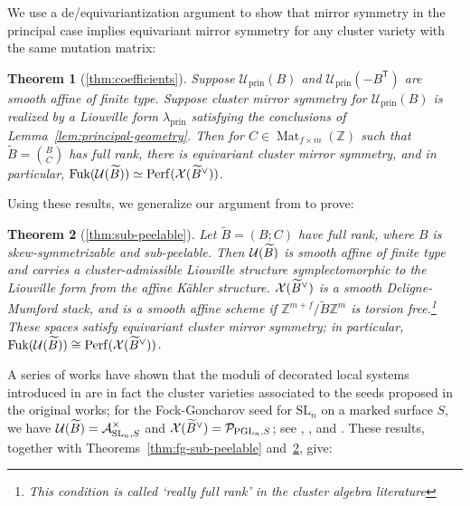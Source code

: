 \documentclass[12pt, letter]{amsart}
\newtheorem{theorem}{Theorem}[section]
\theoremstyle{definition}
\newcommand{\Z}{\mathbb Z}
\newcommand{\Ac}{\mathcal A}
\newcommand{\PP}{\mathcal P}
\newcommand{\pr}{\mathrm{prin}}
\numberwithin{equation}{section}
\begin{document}
We use a de/equivariantization argument to show that mirror symmetry in the principal case implies equivariant mirror symmetry for any cluster variety with the same mutation matrix:
\begin{theorem}[\ref{thm:coefficients}] \label{thm:coefficients-intro}
Suppose $\mathcal U_{\pr}(B)$ and
$\mathcal U_{\pr}(-B^{\mathsf T})$ are smooth affine of finite type.
Suppose cluster mirror symmetry for $\mathcal U_{\pr}(B)$ is realized by
a Liouville form $\lambda_{\pr}$ satisfying the conclusions of
Lemma~\ref{lem:principal-geometry}.
Then for  $C\in\operatorname{Mat}_{f\times m}(\Z)$ such that $\widetilde{B} = \binom BC$ has full rank, there is  equivariant
cluster mirror symmetry, and in particular,
$\operatorname{Fuk}(\mathcal U(\widetilde B))
 \simeq
 \mathrm{Perf}( \mathcal X(\widetilde B^\vee) )$.
\end{theorem}

Using these results, we generalize our argument from \cite{HS} to prove:



\begin{theorem}[\ref{thm:sub-peelable}]\label{thm:main} 
Let $\widetilde B=(B;C)$ have full rank, where $B$ is
skew-symmetrizable and sub-peelable.
Then $\mathcal{U}(\widetilde B)$ is smooth affine of finite type and
carries a cluster-admissible Liouville structure symplectomorphic to the Liouville form from the affine K\"ahler structure. $\mathcal{X}(\widetilde B^\vee)$ is a smooth Deligne-Mumford stack, and is a smooth affine scheme if $\Z^{m+f}/\widetilde B \Z^m$ is torsion free.\footnote{This condition is called `really full rank' in the cluster algebra literature}   These spaces satisfy equivariant cluster mirror symmetry; in particular, $\operatorname{Fuk}(\mathcal{U}(\widetilde B)) \cong \mathrm{Perf}(\mathcal{X}(\widetilde B^\vee))$.
\end{theorem}






A series of works have shown that the moduli of decorated local systems introduced in \cite{FG, GS} are in fact the cluster varieties associated to the seeds proposed in the original works;  for the Fock-Goncharov seed for $\mathrm{SL}_n$ on a marked surface $S$, we have 
$\cU(\widetilde B)=\Ac^\times_{\mathrm{SL}_n,S}$ and
$\cX(\widetilde B^\vee)=\PP_{\mathrm{PGL}_n,S}$; see
\cite[Lemma~3.7, Remarks~3.8, 3.10, Theorems~3.21, 4.3 and Lemma~4.4]{IOS},
\cite[Lemma~3.4, Theorem~3.15, Remark~3.17 and Section~4.6]{IO}, and
\cite[Theorem~1.1]{Shen}.
These results, together with Theorems~\ref{thm:fg-sub-peelable} and~\ref{thm:main}, give:
\end{document}
